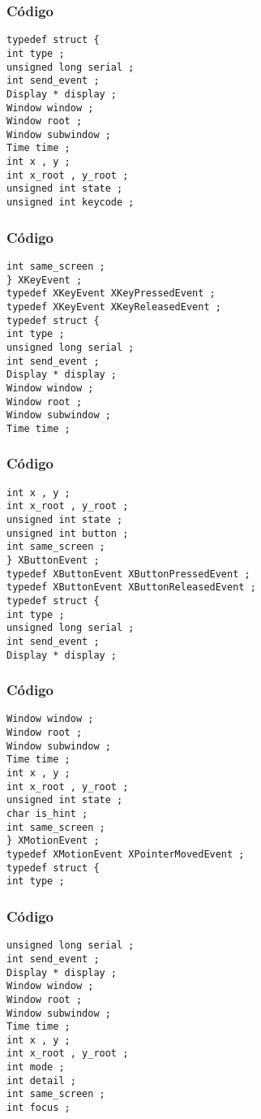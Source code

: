 \documentclass{beamer}
\begin{document}
\begin{frame}[fragile]
\frametitle{C\'odigo}
\begin{verbatim}
typedef struct { 
int type ; 
unsigned long serial ; 
int send_event ; 
Display * display ; 
Window window ; 
Window root ; 
Window subwindow ; 
Time time ; 
int x , y ; 
int x_root , y_root ; 
unsigned int state ; 
unsigned int keycode ; 
\end{verbatim}
\end{frame}
\begin{frame}[fragile]
\frametitle{C\'odigo}
\begin{verbatim}
int same_screen ; 
} XKeyEvent ; 
typedef XKeyEvent XKeyPressedEvent ; 
typedef XKeyEvent XKeyReleasedEvent ; 
typedef struct { 
int type ; 
unsigned long serial ; 
int send_event ; 
Display * display ; 
Window window ; 
Window root ; 
Window subwindow ; 
Time time ; 
\end{verbatim}
\end{frame}
\begin{frame}[fragile]
\frametitle{C\'odigo}
\begin{verbatim}
int x , y ; 
int x_root , y_root ; 
unsigned int state ; 
unsigned int button ; 
int same_screen ; 
} XButtonEvent ; 
typedef XButtonEvent XButtonPressedEvent ; 
typedef XButtonEvent XButtonReleasedEvent ; 
typedef struct { 
int type ; 
unsigned long serial ; 
int send_event ; 
Display * display ; 
\end{verbatim}
\end{frame}
\begin{frame}[fragile]
\frametitle{C\'odigo}
\begin{verbatim}
Window window ; 
Window root ; 
Window subwindow ; 
Time time ; 
int x , y ; 
int x_root , y_root ; 
unsigned int state ; 
char is_hint ; 
int same_screen ; 
} XMotionEvent ; 
typedef XMotionEvent XPointerMovedEvent ; 
typedef struct { 
int type ; 
\end{verbatim}
\end{frame}
\begin{frame}[fragile]
\frametitle{C\'odigo}
\begin{verbatim}
unsigned long serial ; 
int send_event ; 
Display * display ; 
Window window ; 
Window root ; 
Window subwindow ; 
Time time ; 
int x , y ; 
int x_root , y_root ; 
int mode ; 
int detail ; 
int same_screen ; 
int focus ; 
\end{verbatim}
\end{frame}
\end{document}
